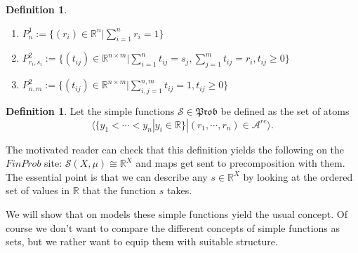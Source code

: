 \documentclass[a4paper]{amsproc}
\theoremstyle{plain}
\theoremstyle{definition}
\newtheorem{definition}[theorem]{Definition}
\theoremstyle{remark}
\numberwithin{equation}{section}
\begin{document}


\begin{definition}
    \begin{enumerate}
        \item $P^1_n := \{ (r_i) \in \mathbb{R}^n | \sum_{i=1}^n r_i = 1 \}$
        \item $P^2_{r_i,s_i} := \{ (t_{ij}) \in \mathbb{R}^{n \times m} | \sum_{i=1}^n t_{ij} = s_j, \sum_{j=1}^m t_{ij} = r_i, t_{ij} \geq 0 \}$
        \item $P^2_{n,m} := \{ (t_{ij}) \in \mathbb{R}^{n \times m} | \sum_{i,j = 1}^{n,m} t_{ij} = 1 , t_{ij} \geq 0 \}$
    \end{enumerate}
\end{definition}

\begin{definition}
    Let the simple functions $\mathcal{S} \in \mathfrak{Prob}$ be defined as the set of atoms
    \[
        \langle \{y_1 < \cdots < y_n | y_i \in \mathbb{R} \} | (r_1, \cdots, r_n) \in \mathcal{A}^{re} \rangle .
    \]
\end{definition}

The motivated reader can check that this definition yields the following on the $FinProb$ site: $\mathcal{S}(X,\mu) \cong \mathbb{R}^X$ and maps get sent to precomposition with them. The essential point is that we can describe any $s \in \mathbb{R}^X$ by looking at the ordered set of values in $\mathbb{R}$ that the function $s$ takes.

We will show that on models these simple functions yield the usual concept. Of course we don't want to compare the different concepts of simple functions as sets, but we rather want to equip them with suitable structure.
\end{document}
